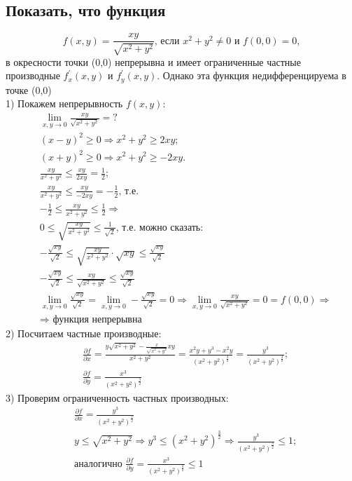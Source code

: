 \documentclass[a4paper, 12pt]{article}
\begin{document}
\subsection{Показать, что функция}
$$f(x,y) = \frac{xy}{\sqrt{x^2+y^2}} \text{, если } x^2+y^2 \neq 0 \text{ и } f(0,0)=0, $$
в окресности точки   (0,0) непрерывна и имеет ограниченные частные производные 
$f_x^{'}(x,y) $ и $f_y^{'}(x,y) $. Однако эта функция недифференцируема в точке (0,0) \\
1) Покажем непрерывность $f(x,y)$: \\
\begin{align*}
 &\lim_{x,y \to 0} \frac{xy}{\sqrt{x^2 + y^2}} = ? \\
 &(x-y)^2 \geq 0 \Rightarrow x^2+y^2 \geq 2xy; \\
 &(x+y)^2 \geq 0 \Rightarrow x^2+y^2 \geq -2xy.\\
 &\frac{xy}{x^2+y^2} \leq \frac{xy}{2xy} = \frac{1}{2}; \\
 &\frac{xy}{x^2+y^2} \leq \frac{xy}{-2xy} = -\frac{1}{2} \text{, т.е.} \\
 &-\frac{1}{2} \leq \frac{xy}{x^2+y^2} \leq \frac{1}{2} \Rightarrow \\
 & 0 \leq \sqrt{\frac{xy}{x^2+y^2}} \leq \frac{1}{\sqrt{2}} \text{, т.е. можно сказать:}\\
 &-\frac{\sqrt{xy}}{\sqrt{2}} \leq \sqrt{\frac{xy}{x^2+y^2}}\cdot \sqrt{xy} \leq
 \frac{\sqrt{xy}}{\sqrt{2}} \\
 &-\frac{\sqrt{xy}}{\sqrt{2}} \leq \frac{xy}{\sqrt{x^2+y^2}} \leq
 \frac{\sqrt{xy}}{\sqrt{2}} \\
 &\lim_{x,y \to 0}\frac{\sqrt{xy}}{\sqrt{2}} = \lim_{x,y \to 0}-\frac{\sqrt{xy}}{\sqrt{2}} = 0 \Rightarrow \lim_{x,y \to 0} \frac{xy}{\sqrt{x^2 + y^2}} = 0 = f(0,0) \Rightarrow \\
 &\Rightarrow\text{ функция непрерывна}
\end{align*}
2) Посчитаем частные производные: \\
\begin{align*}
 &\frac{\partial f}{\partial x} = 
 \frac{y\sqrt{x^2+y^2} - \frac{x}{\sqrt{x^2+y^2}}xy}{x^2+y^2} = 
 \frac{x^2y+y^3 - x^2y}{(x^2+y^2)^{\frac{3}{2}}} = \frac{y^3}{(x^2+y^2)^\frac{3}{2}}; \\
 &\frac{\partial f}{\partial y} = \frac{x^3}{(x^2+y^2)^\frac{3}{2}}
\end{align*}
3) Проверим ограниченность частных производных: 
\begin{align*}
 &\frac{\partial f}{\partial x} = \frac{y^3}{(x^2+y^2)^\frac{3}{2}} \\
 &y \leq \sqrt{x^2+y^2} \Rightarrow y^3 \leq (x^2+y^2)^\frac{3}{2} \Rightarrow
 \frac{y^3}{(x^2+y^2)^\frac{3}{2}} \leq 1; \\
 &\text{аналогично }
 \frac{\partial f}{\partial y} = \frac{x^3}{(x^2+y^2)^\frac{3}{2}} \leq 1
\end{align*}
\end{document}
